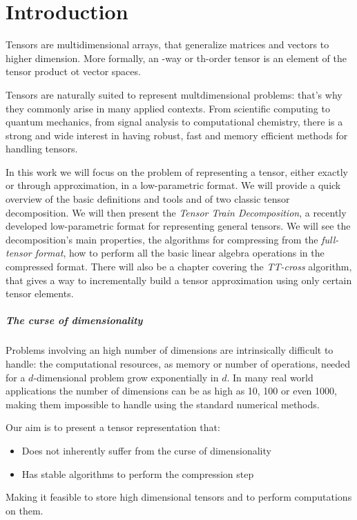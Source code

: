 \chapter{Introduction}
Tensors are multidimensional arrays, that generalize matrices and vectors to higher dimension. More formally, an \N-way or \N th-order tensor is an element of the tensor product ot \N vector spaces.

Tensors are naturally suited to represent multdimensional problems: that's why they commonly arise in many applied contexts. From scientific computing to quantum mechanics, from signal analysis to computational chemistry, there is a strong and wide interest in having robust, fast and memory efficient methods for handling tensors.

In this work we will focus on the problem of representing a tensor, either exactly or through approximation, in a low-parametric format.
We will provide a quick overview of the basic definitions and tools and of two classic tensor decomposition. We will then present the \emph{Tensor Train Decomposition}, a recently developed low-parametric format for representing general tensors. We will see the decomposition's main properties, the algorithms for compressing from the \emph{full-tensor format}, how to perform all the basic linear algebra operations in the compressed format. There will also be a chapter covering the \emph{TT-cross} algorithm, that gives a way to incrementally build a tensor approximation using only certain tensor elements.

\paragraph{The curse of dimensionality}
Problems involving an high number of dimensions are intrinsically difficult to handle: the computational resources, as memory or number of operations, needed for a $d$-dimensional problem grow exponentially in $d$. In many real world applications the number of dimensions can be as high as 10, 100 or even 1000, making them impossible to handle using the standard numerical methods.

Our aim is to present a tensor representation that:
\begin{itemize}
\item Does not inherently suffer from the curse of dimensionality
\item Has stable algorithms to perform the compression step 
\end{itemize}
Making it feasible to store high dimensional tensors and to perform computations on them.
